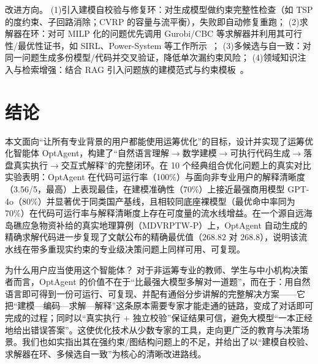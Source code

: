 \documentclass[11pt]{article}
\begin{document}
改进方向。
(1)引入建模自校验与修复环：对生成模型做约束完整性检查（如 TSP 的度约束、子回路消除；CVRP 的容量与流平衡），失败即自动修复重跑；
(2)求解器在环：对可 MILP 化的问题优先调用 Gurobi/CBC 等求解器并利用其可行性/最优性证书，如 SIRL、Power-System 等工作所示~\cite{chen2025sirl,hu2025power}；
(3)多候选与自一致：对同一问题生成多份模型/代码并交叉验证，降低单次漏约束风险；
(4)领域知识注入与检索增强：结合 RAG 引入问题族的建模范式与约束模板~\cite{wan2025healthcare,li2023synthesizing}。

\section{结论}\label{sec:conclusion}

本文面向“让所有专业背景的用户都能使用运筹优化”的目标，设计并实现了运筹优化智能体 OptAgent，构建了“自然语言理解$\rightarrow$数学建模$\rightarrow$可执行代码生成$\rightarrow$落盘真实执行$\rightarrow$交互式解释”的完整闭环。在 10 个经典组合优化问题上的真实对比实验表明：OptAgent 在代码可运行率（100\%）与面向非专业用户的解释清晰度（3.56/5，最高）上表现最佳，在建模准确性（70\%）上接近最强商用模型 GPT-4o（80\%）并显著优于同类国产基线，且相较同底座裸模型（最优命中率同为 70\%）在代码可运行率与解释清晰度上存在可度量的流水线增益。在一个源自远海岛礁应急物资补给的真实地理算例（MDVRPTW-P）上，OptAgent 自动生成的精确求解代码进一步复现了文献公布的精确最优值（$268.82$ 对 $268.8$），说明该流水线在带多重现实约束的专业级决策问题上同样可用、可复现。

为什么用户应当使用这个智能体？ 对于非运筹专业的教师、学生与中小机构决策者而言，OptAgent 的价值不在于“比最强大模型多解对一道题”，而在于：用自然语言即可得到一份可运行、可复现、并配有通俗分步讲解的完整解决方案——它把“建模—编码—求解—解释”这条原本需要专家才能走通的链路，变成了对话即可完成的过程；同时以“真实执行 + 独立校验”保证结果可信，避免大模型“一本正经地给出错误答案”。这使优化技术从少数专家的工具，走向更广泛的教育与决策场景。我们也如实指出其在强约束/图结构问题上的不足，并给出了以“建模自校验、求解器在环、多候选自一致”为核心的清晰改进路线。
\end{document}
